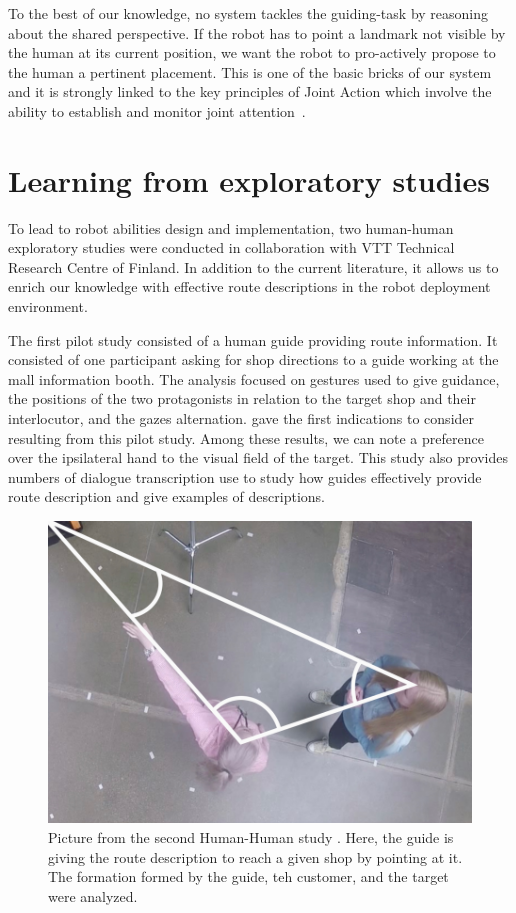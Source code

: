 To the best of our knowledge, no system tackles the guiding-task by reasoning about the shared perspective. If the robot has to point a landmark not visible by the human at its current position, we want the robot to pro-actively propose to the human a pertinent placement. This is one of the basic bricks of our system and it is strongly linked to the key principles of Joint Action which involve the ability to establish and monitor joint attention~\cite{pacherie_2012_phenomenology}.

\section{Learning from exploratory studies}

To lead to robot abilities design and implementation, two human-human exploratory studies were conducted in collaboration with VTT Technical Research Centre of Finland. In addition to the current literature, it allows us to enrich our knowledge with effective route descriptions in the robot deployment environment.

The first pilot study consisted of a human guide providing route information. It consisted of one participant asking for shop directions to a guide working at the mall information booth. The analysis focused on gestures used to give guidance, the positions of the two protagonists in relation to the target shop and their interlocutor, and the gazes alternation. \cite{belhassein_2017_human} gave the first indications to consider resulting from this pilot study. Among these results, we can note a preference over the ipsilateral hand to the visual field of the target. This study also provides numbers of dialogue transcription use to study how guides effectively provide route description and give examples of descriptions.

\begin{figure}[ht!]
\centering
\includegraphics[scale=0.35]{figures/chapter8/human_guide.png}
\caption{\label{fig:chap8_human_guide} Picture from the second Human-Human study \cite{belhassein_2017_human}. Here, the guide is giving the route description to reach a given shop by pointing at it. The formation formed by the guide, teh customer, and the target were analyzed. }
\end{figure}

